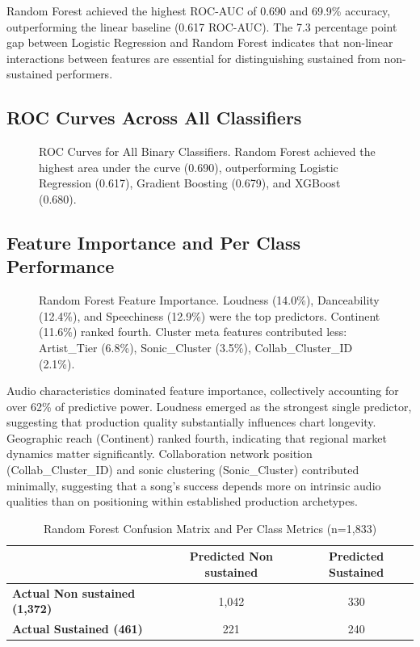 \documentclass{article}
\begin{document}
Random Forest achieved the highest ROC-AUC of 0.690 and 69.9\% accuracy, outperforming the linear baseline (0.617 ROC-AUC). The 7.3 percentage point gap between Logistic Regression and Random Forest indicates that non-linear interactions between features are essential for distinguishing sustained from non-sustained performers.


\subsection*{ROC Curves Across All Classifiers}

\begin{figure}[h]
\centering

\caption{ROC Curves for All Binary Classifiers. Random Forest achieved the highest area under the curve (0.690), outperforming Logistic Regression (0.617), Gradient Boosting (0.679), and XGBoost (0.680).}
\label{fig:roc_curves}
\end{figure}

\subsection*{Feature Importance and Per Class Performance}

\begin{figure}[h]
\centering

\caption{Random Forest Feature Importance. Loudness (14.0\%), Danceability (12.4\%), and Speechiness (12.9\%) were the top predictors. Continent (11.6\%) ranked fourth. Cluster meta features contributed less: Artist\_Tier (6.8\%), Sonic\_Cluster (3.5\%), Collab\_Cluster\_ID (2.1\%).}
\label{fig:feature_importance}
\end{figure}
Audio characteristics dominated feature importance, collectively accounting for over 62\% of predictive power. Loudness emerged as the strongest single predictor, suggesting that production quality substantially influences chart longevity. Geographic reach (Continent) ranked fourth, indicating that regional market dynamics matter significantly. Collaboration network position (Collab\_Cluster\_ID) and sonic clustering (Sonic\_Cluster) contributed minimally, suggesting that a song's success depends more on intrinsic audio qualities than on positioning within established production archetypes.
\begin{table}[h]
\centering
\caption{Random Forest Confusion Matrix and Per Class Metrics (n=1,833)}
\label{tab:confusion_matrix}
\begin{tabular}{lcc}
\toprule
& \textbf{Predicted Non sustained} & \textbf{Predicted Sustained} \\
\midrule
\textbf{Actual Non sustained (1,372)} & 1,042 & 330 \\
\textbf{Actual Sustained (461)} & 221 & 240 \\
\bottomrule
\end{tabular}
\end{table}
\end{document}
